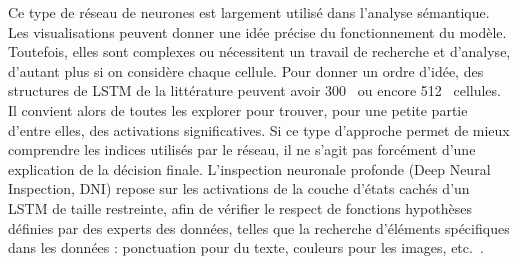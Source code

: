Ce type de réseau de neurones est largement utilisé dans l'analyse sémantique.
Les visualisations peuvent donner une idée précise du fonctionnement du modèle. Toutefois, elles sont complexes ou nécessitent un travail de recherche et d’analyse, d’autant plus si on considère chaque cellule.
Pour donner un ordre d'idée, des structures de LSTM de la littérature peuvent avoir 300~\cite{Lin2017} ou encore 512~\cite{Karpathy2016} cellules. Il convient alors de toutes les explorer pour trouver, pour une petite partie d'entre elles, des activations significatives.
Si ce type d’approche permet de mieux comprendre les indices utilisés par le réseau, il ne s’agit pas forcément d’une explication de la décision finale. L'inspection neuronale profonde (Deep Neural Inspection, DNI) repose sur les activations de la couche d'états cachés d'un LSTM de taille restreinte, afin de vérifier le respect de fonctions hypothèses définies par des experts des données, telles que la recherche d'éléments spécifiques dans les données : ponctuation pour du texte, couleurs pour les images, etc.~\cite{Sellam2019}.



